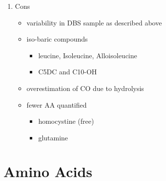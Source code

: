 \documentclass{scrartcl}
\begin{document}
\begin{enumerate}
\begin{enumerate}
\item Cons
\label{sec:org7917c3a}
\begin{itemize}
\item variability in DBS sample as described above
\item iso-baric compounds
\begin{itemize}
\item leucine, Isoleucine, Alloisoleucine
\item C5DC and C10-OH
\end{itemize}
\item overestimation of CO due to hydrolysis
\item fewer AA quantified
\begin{itemize}
\item homocystine (free)
\item glutamine
\end{itemize}
\end{itemize}
\end{enumerate}
\end{enumerate}
\section{Amino Acids}
\label{sec:orgfbdcff9}
\end{document}
